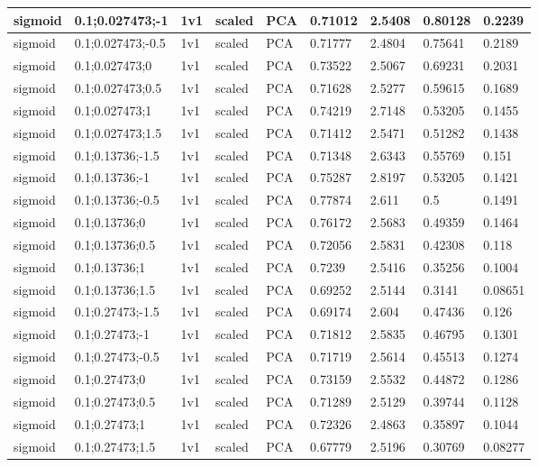 \begin{longtable}{lllllllll}
sigmoid & 0.1;0.027473;-1 & 1v1 & scaled & PCA & 0.71012 & 2.5408 & 0.80128 & 0.2239\\ \hline
sigmoid & 0.1;0.027473;-0.5 & 1v1 & scaled & PCA & 0.71777 & 2.4804 & 0.75641 & 0.2189\\ \hline
sigmoid & 0.1;0.027473;0 & 1v1 & scaled & PCA & 0.73522 & 2.5067 & 0.69231 & 0.2031\\ \hline
sigmoid & 0.1;0.027473;0.5 & 1v1 & scaled & PCA & 0.71628 & 2.5277 & 0.59615 & 0.1689\\ \hline
sigmoid & 0.1;0.027473;1 & 1v1 & scaled & PCA & 0.74219 & 2.7148 & 0.53205 & 0.1455\\ \hline
sigmoid & 0.1;0.027473;1.5 & 1v1 & scaled & PCA & 0.71412 & 2.5471 & 0.51282 & 0.1438\\ \hline
sigmoid & 0.1;0.13736;-1.5 & 1v1 & scaled & PCA & 0.71348 & 2.6343 & 0.55769 & 0.151\\ \hline
sigmoid & 0.1;0.13736;-1 & 1v1 & scaled & PCA & 0.75287 & 2.8197 & 0.53205 & 0.1421\\ \hline
sigmoid & 0.1;0.13736;-0.5 & 1v1 & scaled & PCA & 0.77874 & 2.611 & 0.5 & 0.1491\\ \hline
sigmoid & 0.1;0.13736;0 & 1v1 & scaled & PCA & 0.76172 & 2.5683 & 0.49359 & 0.1464\\ \hline
sigmoid & 0.1;0.13736;0.5 & 1v1 & scaled & PCA & 0.72056 & 2.5831 & 0.42308 & 0.118\\ \hline
sigmoid & 0.1;0.13736;1 & 1v1 & scaled & PCA & 0.7239 & 2.5416 & 0.35256 & 0.1004\\ \hline
sigmoid & 0.1;0.13736;1.5 & 1v1 & scaled & PCA & 0.69252 & 2.5144 & 0.3141 & 0.08651\\ \hline
sigmoid & 0.1;0.27473;-1.5 & 1v1 & scaled & PCA & 0.69174 & 2.604 & 0.47436 & 0.126\\ \hline
sigmoid & 0.1;0.27473;-1 & 1v1 & scaled & PCA & 0.71812 & 2.5835 & 0.46795 & 0.1301\\ \hline
sigmoid & 0.1;0.27473;-0.5 & 1v1 & scaled & PCA & 0.71719 & 2.5614 & 0.45513 & 0.1274\\ \hline
sigmoid & 0.1;0.27473;0 & 1v1 & scaled & PCA & 0.73159 & 2.5532 & 0.44872 & 0.1286\\ \hline
sigmoid & 0.1;0.27473;0.5 & 1v1 & scaled & PCA & 0.71289 & 2.5129 & 0.39744 & 0.1128\\ \hline
sigmoid & 0.1;0.27473;1 & 1v1 & scaled & PCA & 0.72326 & 2.4863 & 0.35897 & 0.1044\\ \hline
sigmoid & 0.1;0.27473;1.5 & 1v1 & scaled & PCA & 0.67779 & 2.5196 & 0.30769 & 0.08277\\ \hline

\end{longtable}
